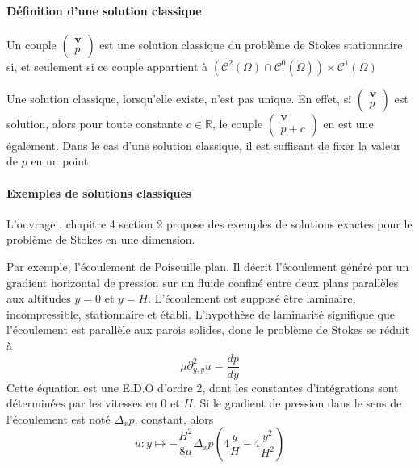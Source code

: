 \paragraph{Définition d'une solution classique} Un couple $\begin{pmatrix} \mathbf{v} \\ p \end{pmatrix}$ est une solution classique du problème de Stokes stationnaire si, et seulement si ce couple appartient à $\left( \mathcal{C}^2(\Omega) \cap \mathcal{C}^0(\bar{\Omega})\right) \times \mathcal{C}^1(\Omega)$

Une solution classique, lorsqu'elle existe, n'est pas unique. En effet, si $\begin{pmatrix} \mathbf{v} \\ p \end{pmatrix}$ est solution, alors pour toute constante $c \in \mathbb{R}$, le couple $\begin{pmatrix} \mathbf{v} \\ p+c \end{pmatrix}$ en est une également. Dans le cas d'une solution classique, il est suffisant de fixer la valeur de $p$ en un point.

\paragraph{Exemples de solutions classiques} L'ouvrage \cite{jpc}, chapitre 4 section 2 propose des exemples de solutions exactes pour le problème de Stokes en une dimension.

Par exemple, l'écoulement de Poiseuille plan. Il décrit l'écoulement généré par un gradient horizontal de pression sur un fluide confiné entre deux plans parallèles aux altitudes $y=0$ et $y=H$. L'écoulement est supposé être laminaire, incompressible, stationnaire et établi. L'hypothèse de laminarité signifique que l'écoulement est parallèle aux parois solides, donc le problème de Stokes se réduit à
\begin{equation*} \tag{P}
    \mu \partial^2_{y,y} u = \frac{dp}{dy} 
\end{equation*}
Cette équation est une E.D.O d'ordre 2, dont les constantes d'intégrations sont déterminées par les vitesses en $0$ et $H$. Si le gradient de pression dans le sens de l'écoulement est noté $\Delta_x p$, constant, alors $$ u : y \mapsto -\frac{H^2}{8\mu} \Delta_x p \left( 4\frac{y}{H} - 4\frac{y^2}{H^2} \right) $$

